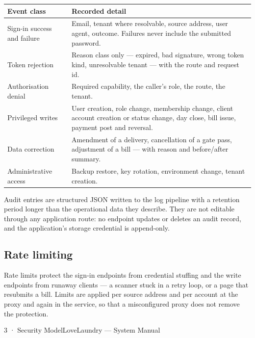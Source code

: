 \documentclass[11pt,a4paper,oneside]{book}
\begin{document}
\begin{center}\small
\begin{tabularx}{\linewidth}{|X|X|}
\hline
\rowcolor{lightgrey}
\textbf{Event class} & \textbf{Recorded detail} \\ \hline
Sign-in success and failure & Email, tenant where resolvable, source address, user agent, outcome. Failures never include the submitted password. \\ \hline
Token rejection & Reason class only — expired, bad signature, wrong token kind, unresolvable tenant — with the route and request id. \\ \hline
Authorisation denial & Required capability, the caller's role, the route, the tenant. \\ \hline
Privileged writes & User creation, role change, membership change, client account creation or status change, day close, bill issue, payment post and reversal. \\ \hline
Data correction & Amendment of a delivery, cancellation of a gate pass, adjustment of a bill — with reason and before/after summary. \\ \hline
Administrative access & Backup restore, key rotation, environment change, tenant creation. \\ \hline
\end{tabularx}
\end{center}
Audit entries are structured JSON written to the log pipeline with a retention period longer than the operational data they describe. They are not editable through any application route: no endpoint updates or deletes an audit record, and the application's storage credential is append-only.

\subsection*{Rate limiting}
Rate limits protect the sign-in endpoints from credential stuffing and the write endpoints from runaway clients — a scanner stuck in a retry loop, or a page that resubmits a bill. Limits are applied per source address and per account at the proxy and again in the service, so that a misconfigured proxy does not remove the protection.

3 · Security ModelLoveLaundry — System Manual
\end{document}
